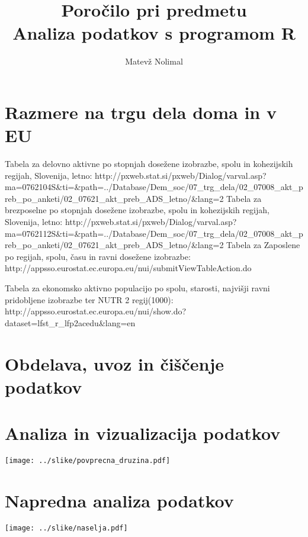 \documentclass[11pt,a4paper]{article}
\begin{document}
\title{Poročilo pri predmetu \\
Analiza podatkov s programom R}
\author{Matevž Nolimal}
\maketitle

\section{Razmere na trgu dela doma in v EU}
Tabela za delovno aktivne po stopnjah dosežene izobrazbe, spolu in kohezijskih regijah, Slovenija, letno:\n
http://pxweb.stat.si/pxweb/Dialog/varval.asp?ma=0762104S&ti=&path=../Database/Dem_soc/07_trg_dela/02_07008_akt_preb_po_anketi/02_07621_akt_preb_ADS_letno/&lang=2\n
Tabela za brezposelne po stopnjah dosežene izobrazbe, spolu in kohezijskih regijah, Slovenija, letno:\n
http://pxweb.stat.si/pxweb/Dialog/varval.asp?ma=0762112S&ti=&path=../Database/Dem_soc/07_trg_dela/02_07008_akt_preb_po_anketi/02_07621_akt_preb_ADS_letno/&lang=2\n
Tabela za Zaposlene po regijah, spolu, času in ravni dosežene izobrazbe:\n
http://appsso.eurostat.ec.europa.eu/nui/submitViewTableAction.do\n

Tabela za ekonomsko aktivno populacijo po spolu, starosti, najvišji ravni pridobljene izobrazbe ter NUTR 2 regij(1000):\n
http://appsso.eurostat.ec.europa.eu/nui/show.do?dataset=lfst_r_lfp2acedu&lang=en\n


\section{Obdelava, uvoz in čiščenje podatkov}

\section{Analiza in vizualizacija podatkov}

\texttt{[image: ../slike/povprecna\_druzina.pdf]}

\section{Napredna analiza podatkov}

\texttt{[image: ../slike/naselja.pdf]}
\end{document}
